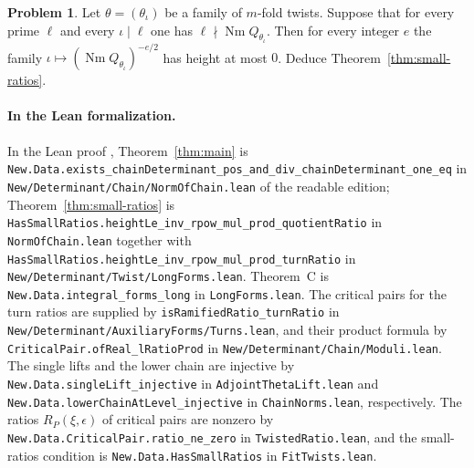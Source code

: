\documentclass[reqno]{amsart}
\theoremstyle{definition}
\newtheorem{problem}{Problem}[section]
\theoremstyle{plain}
\newcommand{\Nm}{\operatorname{Nm}}
\begin{document}
\begin{problem}\label{pr:norm-height}
Let \(\theta = (\theta_\iota)\) be a family of \(m\)-fold twists.  Suppose that for every prime \(\ell\) and every \(\iota \mid \ell\) one has \(\ell \nmid \Nm Q_{\theta_\iota}\).  Then for every integer \(e\) the family \(\iota \mapsto (\Nm Q_{\theta_\iota})^{-e/2}\) has height at most \(0\).  Deduce Theorem~\ref{thm:small-ratios}.
\end{problem}

\paragraph{In the Lean formalization.}
\begin{sloppypar}
In the Lean proof \cite{GL}, Theorem~\ref{thm:main} is \texttt{New.Data.exists\_\allowbreak chainDeterminant\_\allowbreak pos\_\allowbreak and\_\allowbreak div\_\allowbreak chainDeterminant\_\allowbreak one\_\allowbreak eq} in \texttt{New/\allowbreak Determinant/\allowbreak Chain/\allowbreak NormOfChain.lean} of the readable edition; Theorem~\ref{thm:small-ratios} is \texttt{HasSmallRatios.\allowbreak heightLe\_\allowbreak inv\_\allowbreak rpow\_\allowbreak mul\_\allowbreak prod\_\allowbreak quotientRatio} in \texttt{NormOfChain.lean} together with \texttt{HasSmallRatios.\allowbreak heightLe\_\allowbreak inv\_\allowbreak rpow\_\allowbreak mul\_\allowbreak prod\_\allowbreak turnRatio} in \texttt{New/\allowbreak Determinant/\allowbreak Twist/\allowbreak LongForms.lean}.  Theorem~C is \texttt{New.Data.integral\_\allowbreak forms\_\allowbreak long} in \texttt{LongForms.lean}.  The critical pairs for the turn ratios are supplied by \texttt{isRamifiedRatio\_\allowbreak turnRatio} in \texttt{New/\allowbreak Determinant/\allowbreak AuxiliaryForms/\allowbreak Turns.lean}, and their product formula by \texttt{CriticalPair.\allowbreak ofReal\_\allowbreak lRatioProd} in \texttt{New/\allowbreak Determinant/\allowbreak Chain/\allowbreak Moduli.lean}.  The single lifts and the lower chain are injective by \texttt{New.Data.\allowbreak singleLift\_\allowbreak injective} in \texttt{AdjointThetaLift.lean} and \texttt{New.Data.\allowbreak lowerChainAtLevel\_\allowbreak injective} in \texttt{ChainNorms.lean}, respectively.  The ratios \(R_P(\xi, \epsilon)\) of critical pairs are nonzero by \texttt{New.Data.\allowbreak CriticalPair.\allowbreak ratio\_\allowbreak ne\_\allowbreak zero} in \texttt{TwistedRatio.lean}, and the small-ratios condition is \texttt{New.Data.\allowbreak HasSmallRatios} in \texttt{FitTwists.lean}.
\end{sloppypar}
\end{document}
